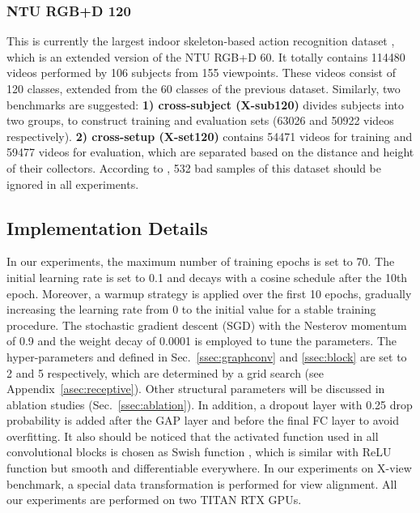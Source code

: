 \documentclass[10pt,journal,compsoc]{IEEEtran}
\begin{document}
\subsubsection{NTU RGB+D 120}
\label{sssec:dataset_ntu120}

This is currently the largest indoor skeleton-based action recognition dataset \cite{liu2019ntu}, which is an extended version of the NTU RGB+D 60. It totally contains 114480 videos performed by 106 subjects from 155 viewpoints. These videos consist of 120 classes, extended from the 60 classes of the previous dataset. Similarly, two benchmarks are suggested: {\bf 1) cross-subject (X-sub120)} divides subjects into two groups, to construct training and evaluation sets (63026 and 50922 videos respectively). {\bf 2) cross-setup (X-set120)} contains 54471 videos for training and 59477 videos for evaluation, which are separated based on the distance and height of their collectors. According to \cite{liu2019ntu}, 532 bad samples of this dataset should be ignored in all experiments.

\subsection{Implementation Details}
\label{ssec:implementation}

In our experiments, the maximum number of training epochs is set to 70. The initial learning rate is set to 0.1 and decays with a cosine schedule after the 10th epoch. Moreover, a warmup strategy \cite{he2016deep} is applied over the first 10 epochs, gradually increasing the learning rate from 0 to the initial value for a stable training procedure. The stochastic gradient descent (SGD) with the Nesterov momentum of 0.9 and the weight decay of 0.0001 is employed to tune the parameters. The hyper-parameters  and  defined in Sec.~\ref{ssec:graphconv} and \ref{ssec:block} are set to 2 and 5 respectively, which are determined by a grid search (see Appendix~\ref{asec:receptive}). Other structural parameters will be discussed in ablation studies (Sec.~\ref{ssec:ablation}). In addition, a dropout layer with 0.25 drop probability is added after the GAP layer and before the final FC layer to avoid overfitting. It also should be noticed that the activated function used in all convolutional blocks is chosen as Swish function \cite{ramachandran2017searching}, which is similar with ReLU function but smooth and differentiable everywhere. In our experiments on X-view benchmark, a special data transformation \cite{shi2019two} is performed for view alignment. All our experiments are performed on two TITAN RTX GPUs.
\end{document}
